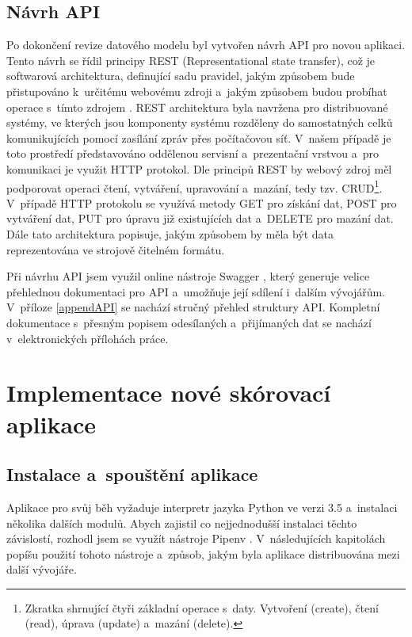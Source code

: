 \documentclass[
  digital,
  twoside,
  table, 
  nolof, 
  nolot
]{fithesis3}
\begin{document}
\newpage

\section{Návrh API}

Po dokončení revize datového modelu byl vytvořen návrh API pro novou aplikaci. Tento návrh se řídil principy REST (Representational state transfer), což je softwarová architektura, definující sadu pravidel, jakým způsobem bude přistupováno k~určitému webovému zdroji a~jakým způsobem budou probíhat operace s~tímto zdrojem \cite{RoyThomasFielding2000ArchitecturalArchitectures}.
REST architektura byla navržena pro distribuované systémy, ve kterých jsou komponenty systému rozděleny do samostatných celků komunikujících pomocí zasílání zpráv přes počítačovou síť. V~našem případě je toto prostředí představováno oddělenou servisní a~prezentační vrstvou a~pro komunikaci je využit HTTP protokol.  Dle principů REST by webový zdroj měl podporovat operaci čtení, vytváření, upravování a~mazání, tedy tzv. CRUD\footnote{Zkratka shrnující čtyři základní operace s~daty. Vytvoření (create), čtení (read), úprava (update) a~mazání (delete).}. V~případě HTTP protokolu se využívá metody GET pro získání dat, POST pro vytváření dat, PUT pro úpravu již existujících dat a~DELETE pro mazání dat. Dále tato architektura popisuje, jakým způsobem by měla být data reprezentována ve strojově čitelném formátu. \cite{RoyThomasFielding2000ArchitecturalArchitectures}

Při návrhu API jsem využil online nástroje Swagger \cite{swagger}, který generuje velice přehlednou dokumentaci pro API a~umožňuje její sdílení i~dalším vývojářům. V~příloze \ref{appendAPI} se nachází stručný přehled struktury API. Kompletní dokumentace s~přesným popisem odesílaných a~přijímaných dat se nachází v~elektronických přílohách práce.

\chapter{Implementace nové skórovací aplikace}
\label{implementationNewApp}

\section{Instalace a~spouštění aplikace}
Aplikace pro svůj běh vyžaduje interpretr jazyka Python ve verzi 3.5 a~instalaci několika dalších modulů. Abych zajistil co nejjednodušší instalaci těchto závislostí, rozhodl jsem se využít nástroje Pipenv \cite{pipenv}. V~následujících kapitolách popíšu použití tohoto nástroje a~způsob, jakým byla aplikace distribuována mezi další vývojáře.
\end{document}
